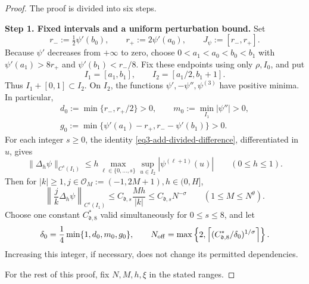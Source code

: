 \documentclass[reqno,12pt]{amsart}
\numberwithin{equation}{section}
\begin{document}
\begin{proof}
The proof is divided into six steps.

\medskip
\noindent\textbf{Step 1. Fixed intervals and a uniform perturbation bound.}
Set
\[
 r_-:=\tfrac12\psi'(b_0),\qquad
 r_+:=2\psi'(a_0),\qquad J_\psi:=[r_-,r_+].
\]
Because $\psi'$ decreases from $+\infty$ to zero, choose
$0<a_1<a_0<b_0<b_1$ with
$\psi'(a_1)>8r_+$ and $\psi'(b_1)<r_-/8$.
Fix these endpoints using only $\rho,I_0$, and put
\[
 I_1=[a_1,b_1],\qquad I_2=[a_1/2,b_1+1].
\]
Thus $I_1+[0,1]\subset I_2$. On $I_2$, the functions
$\psi',-\psi'',\psi^{(3)}$ have positive minima. In particular,
\[
 \begin{gathered}
 d_0:=\min\{r_-,r_+/2\}>0,\qquad
 m_0:=\min_{I_1}|\psi''|>0,\\
 g_0:=\min\{\psi'(a_1)-r_+,r_- -\psi'(b_1)\}>0.
 \end{gathered}
\]
For each integer $s\ge0$, the identity
\eqref{eq3-add-divided-difference}, differentiated in $u$, gives
\[
 \|\Delta_h\psi\|_{C^s(I_1)}
 \le h\max_{\ell\in\{0,\ldots,s\}}\sup_{u\in I_2}|\psi^{(\ell+1)}(u)|
                  \qquad(0\le h\le 1).
\]
Then for $|k|\ge1,j\in \mathcal O_M:=(-1,2M+1),h\in (0,H]$,
\begin{equation}
 \left\|\frac jk\Delta_h\psi\right\|_{C^s(I_1)}
 \le C_{\mathfrak d,s}\frac{Mh}{|k|}
 \le C_{\mathfrak d,s}N^{-\sigma}\qquad (1\le M\le N^{\theta}).
 \label{eq3-add-phase-perturbation}
\end{equation}
Choose one constant $C_{\mathfrak d,8}^*$ valid simultaneously for
$0\le s\le8$, and let
\[
 \delta_0=\frac14\min\{1,d_0,m_0,g_0\},\qquad
 N_{\rm off}=\max\left\{2,
 \left\lceil(C_{\mathfrak d,8}^*/\delta_0)^{1/\sigma}\right\rceil
 \right\}.
\]
Increasing this integer, if necessary, does not change its permitted
dependencies. 

For the rest of this proof, fix $N,M,h,\xi$ in the stated ranges.


\end{proof}
\end{document}
